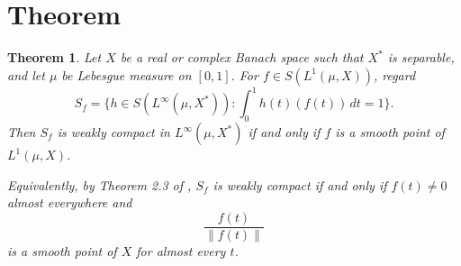 \documentclass[11pt]{article}
\newtheorem{theorem}{Theorem}
\begin{document}
\section{Theorem}

\begin{theorem}
Let \(X\) be a real or complex Banach space such that \(X^*\) is separable,
and let \(\mu\) be Lebesgue measure on \([0,1]\). For
\(f\in S(L^1(\mu,X))\), regard
\[
  S_f=\{h\in S(L^\infty(\mu,X^*)):\int_0^1 h(t)(f(t))\,dt=1\}.
\]
Then \(S_f\) is weakly compact in \(L^\infty(\mu,X^*)\) if and only if \(f\)
is a smooth point of \(L^1(\mu,X)\).

Equivalently, by Theorem 2.3 of \cite{DaptariDwivedi2025}, \(S_f\) is weakly
compact if and only if \(f(t)\ne0\) almost everywhere and
\[
  \frac{f(t)}{\|f(t)\|}
\]
is a smooth point of \(X\) for almost every \(t\).
\end{theorem}
\end{document}

